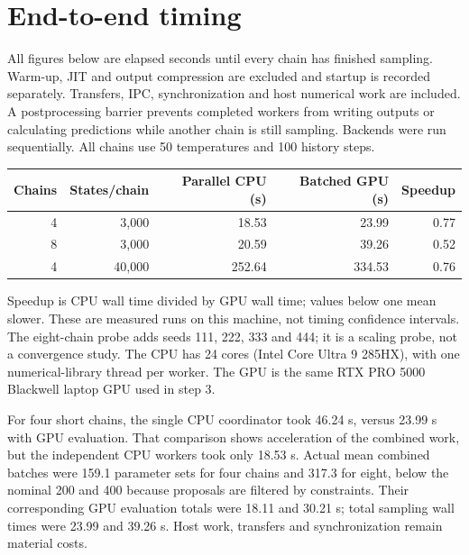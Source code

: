 \documentclass[11pt]{article}
\begin{document}
\section*{End-to-end timing}
All figures below are elapsed seconds until every chain has finished sampling.
Warm-up, JIT and output compression are excluded and startup is recorded
separately. Transfers, IPC, synchronization and host numerical work are included.
A postprocessing barrier prevents completed workers from writing outputs or
calculating predictions while another chain is still sampling. Backends were
run sequentially. All chains use 50 temperatures and 100 history steps.
\begin{center}\begin{tabular}{rrrrr}\toprule
Chains & States/chain & Parallel CPU (s) & Batched GPU (s) & Speedup\\\midrule
4 & 3,000 & 18.53 & 23.99 & 0.77\\
8 & 3,000 & 20.59 & 39.26 & 0.52\\
4 & 40,000 & 252.64 & 334.53 & 0.76\\
\bottomrule\end{tabular}\end{center}
Speedup is CPU wall time divided by GPU wall time; values below one mean slower.
These are measured runs on this machine, not timing confidence intervals.
The eight-chain probe adds seeds 111, 222, 333 and 444; it is a scaling probe,
not a convergence study. The CPU has 24 cores (Intel Core Ultra 9 285HX), with
one numerical-library thread per worker. The GPU is the same RTX PRO 5000
Blackwell laptop GPU used in step 3.

For four short chains, the single CPU coordinator took 46.24 s, versus 23.99 s
with GPU evaluation. That comparison shows acceleration of the combined work,
but the independent CPU workers took only 18.53 s. Actual mean combined batches
were 159.1 parameter sets for four chains and 317.3 for eight, below the nominal
200 and 400 because proposals are filtered by constraints. Their corresponding
GPU evaluation totals were 18.11 and 30.21 s; total sampling wall times were
23.99 and 39.26 s. Host work, transfers and synchronization remain material costs.
\end{document}
